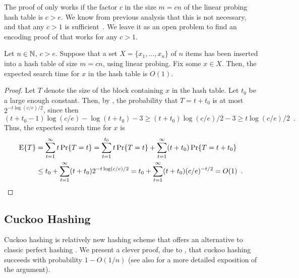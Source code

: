 \documentclass[format=acmsmall, review=false, screen=true]{acmart}
\begin{document}
\begin{rem}
  The proof of  only works if the factor
  $c$ in the size $m = cn$ of the linear probing hash table is 
  $c > e$.
  We know from
  previous analysis that this is not necessary, and that any $c>1$ is
  sufficient~\cite[Theorem~9.8]{flajolet.sedgewick:aofa}. 
  We leave it as an open problem to find an encoding proof
  of  that works for any $c>1$.
\end{rem}

\begin{cor}
  Let $n \in \mathbb{N}$, $c > e$.
  Suppose that a set $X = \{x_1, \dots, x_n\}$ of $n$ items 
  has been inserted into a hash table of size $m = cn$, using linear 
  probing.
  Fix some $x\in X$. 
  Then, the expected search time for $x$ in the hash table is
  $O(1)$.
\end{cor}
\begin{proof}
  Let $T$ denote the size of the block containing $x$ in the
  hash table. Let $t_0$ be a large enough constant. 
  Then, by , the probability
  that $T = t + t_0$ is at most $2^{-t\log(c/e)/2}$,
  since then
  \[(t  + t_0 - 1)\log(c/e) - \log(t+t_0) - 3
  \geq
(t  + t_0)\log(c/e)/2 - 3
    \geq t\log(c/e)/2  \enspace. 
    \]
  Thus, the expected search time for $x$ is
  \begin{align*}
   \operatorname{\mathrm{E}}\{T\} &= \sum_{t = 1}^\infty t\Pr\{T = t\} = \sum_{t=1}^{t_0} t\Pr\{T = t\} + \sum_{t = 1}^\infty (t+t_0)\Pr\{T = t + t_0\} \\
            &\le t_0 + \sum_{t = 1}^\infty (t+t_0)2^{-t \log (c/e)/2} 
            = t_0 + \sum_{t = 1}^\infty (t+t_0)(c/e)^{-t/2} = O(1) \enspace . 
  \end{align*}
\end{proof}

\subsection{Cuckoo Hashing}

Cuckoo hashing is relatively new hashing scheme that offers an
alternative to classic perfect hashing \cite{pagh.rodler:cuckoo}. 
We present a clever proof, due to , that cuckoo hashing
succeeds with probability $1-O(1/n)$ 
(see also  for a more detailed exposition of the 
argument).
\end{document}
